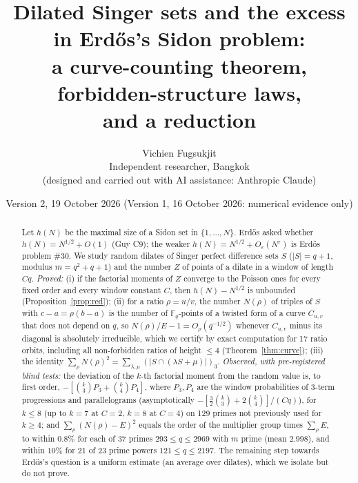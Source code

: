 \documentclass[11pt]{article}
\title{Dilated Singer sets and the excess in Erd\H{o}s's Sidon problem:\\ a curve-counting theorem, forbidden-structure laws,\\ and a reduction}
\author{Vichien Fugsukjit\\ Independent researcher, Bangkok\\ \small(designed and carried out with AI assistance: Anthropic Claude)}
\date{Version 2, 19 October 2026 (Version 1, 16 October 2026: numerical evidence only)}
\begin{document}
\maketitle
\begin{abstract}
Let $h(N)$ be the maximal size of a Sidon set in $\{1,\dots,N\}$. Erd\H{o}s asked whether $h(N)=N^{1/2}+O(1)$ (Guy C9); the weaker
$h(N)=N^{1/2}+O_\varepsilon(N^\varepsilon)$ is Erd\H{o}s problem \#30. We study random dilates of Singer perfect difference sets $S$
($|S|=q+1$, modulus $m=q^2+q+1$) and the number $Z$ of points of a dilate in a window of length $Cq$.
\emph{Proved:} (i) if the factorial moments of $Z$ converge to the Poisson ones for every fixed order and every window constant $C$, then $h(N)-N^{1/2}$ is unbounded
(Proposition~\ref{prop:red}); (ii) for a ratio $\rho=u/v$, the number $N(\rho)$ of triples of $S$ with $c-a=\rho(b-a)$ is the number
of $\mathbb F_q$-points of a twisted form of a curve $C_{u,v}$ that does not depend on $q$, so $N(\rho)/E-1=O_\rho(q^{-1/2})$ whenever
$C_{u,v}$ minus its diagonal is absolutely irreducible, which we certify by exact computation for 17 ratio orbits, including all
non-forbidden ratios of height $\le4$ (Theorem~\ref{thm:curve}); (iii) the identity $\sum_\rho N(\rho)^2=\sum_{\lambda,\mu}(|S\cap(\lambda S+\mu)|)_3$.
\emph{Observed, with pre-registered blind tests:} the deviation of the $k$-th factorial moment from the random value is, to first order,
$-[\binom k3P_3+\binom k4P_4]$, where $P_3,P_4$ are the window probabilities of 3-term progressions and parallelograms (asymptotically
$-[\tfrac32\binom k3+2\binom k4]/(Cq)$), for $k\le8$ (up to $k=7$ at $C=2$, $k=8$ at $C=4$) on 129 primes not previously used for $k\ge4$; and $\sum_\rho(N(\rho)-E)^2$ equals the order of the multiplier
group times $\sum_\rho E$, to within $0.8\%$ for each of 37 primes $293\le q\le2969$ with $m$ prime (mean $2.998$),
and within $10\%$ for 21 of 23 prime powers $121\le q\le2197$. The remaining step towards Erd\H{o}s's question is a uniform estimate
(an average over dilates), which we isolate but do not prove.
\end{abstract}
\end{document}
